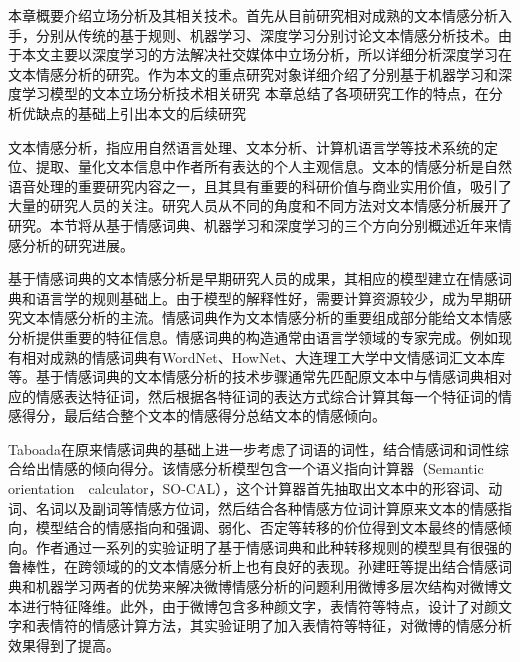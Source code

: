

本章概要介绍立场分析及其相关技术。首先从目前研究相对成熟的文本情感分析入手，分别从传统的基于规则、机器学习、深度学习分别讨论文本情感分析技术。由于本文主要以深度学习的方法解决社交媒体中立场分析，所以详细分析深度学习在文本情感分析的研究。作为本文的重点研究对象详细介绍了分别基于机器学习和深度学习模型的文本立场分析技术相关研究 本章总结了各项研究工作的特点，在分析优缺点的基础上引出本文的后续研究



文本情感分析，指应用自然语言处理、文本分析、计算机语言学等技术系统的定位、提取、量化文本信息中作者所有表达的个人主观信息。文本的情感分析是自然语音处理的重要研究内容之一，且其具有重要的科研价值与商业实用价值，吸引了大量的研究人员的关注。研究人员从不同的角度和不同方法对文本情感分析展开了研究。本节将从基于情感词典、机器学习和深度学习的三个方向分别概述近年来情感分析的研究进展。


基于情感词典的文本情感分析是早期研究人员的成果，其相应的模型建立在情感词典和语言学的规则基础上。由于模型的解释性好，需要计算资源较少，成为早期研究文本情感分析的主流。情感词典作为文本情感分析的重要组成部分能给文本情感分析提供重要的特征信息。情感词典的构造通常由语言学领域的专家完成。例如现有相对成熟的情感词典有WordNet、HowNet、大连理工大学中文情感词汇文本库等。基于情感词典的文本情感分析的技术步骤通常先匹配原文本中与情感词典相对应的情感表达特征词，然后根据各特征词的表达方式综合计算其每一个特征词的情感得分，最后结合整个文本的情感得分总结文本的情感倾向。

Taboada在原来情感词典的基础上进一步考虑了词语的词性，结合情感词和词性综合给出情感的倾向得分。该情感分析模型包含一个语义指向计算器（Semantic　orientation　calculator，SO-CAL），这个计算器首先抽取出文本中的形容词、动词、名词以及副词等情感方位词，然后结合各种情感方位词计算原来文本的情感指向，模型结合的情感指向和强调、弱化、否定等转移的价位得到文本最终的情感倾向。作者通过一系列的实验证明了基于情感词典和此种转移规则的模型具有很强的鲁棒性，在跨领域的的文本情感分析上也有良好的表现。孙建旺等提出结合情感词典和机器学习两者的优势来解决微博情感分析的问题利用微博多层次结构对微博文本进行特征降维。此外，由于微博包含多种颜文字，表情符等特点，设计了对颜文字和表情符的情感计算方法，其实验证明了加入表情符等特征，对微博的情感分析效果得到了提高。

